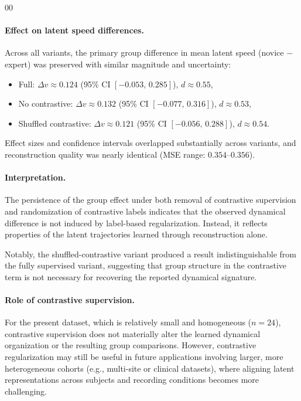 \documentclass[5p,twocolumn,authoryear]{elsarticle}
\begin{document}
\begin{thebibliography}{00}
\paragraph{Effect on latent speed differences.}
Across all variants, the primary group difference in mean latent speed (novice $-$ expert) was preserved with similar magnitude and uncertainty:
\begin{itemize}
    \item Full: $\Delta v \approx 0.124$ \; (95\% CI $[-0.053,\,0.285]$), $d \approx 0.55$,
    \item No contrastive: $\Delta v \approx 0.132$ \; (95\% CI $[-0.077,\,0.316]$), $d \approx 0.53$,
    \item Shuffled contrastive: $\Delta v \approx 0.121$ \; (95\% CI $[-0.056,\,0.288]$), $d \approx 0.54$.
\end{itemize}

Effect sizes and confidence intervals overlapped substantially across variants, and reconstruction quality was nearly identical (MSE range: $0.354$--$0.356$).

\paragraph{Interpretation.}
The persistence of the group effect under both removal of contrastive supervision and randomization of contrastive labels indicates that the observed dynamical difference is not induced by label-based regularization. Instead, it reflects properties of the latent trajectories learned through reconstruction alone.

Notably, the shuffled-contrastive variant produced a result indistinguishable from the fully supervised variant, suggesting that group structure in the contrastive term is not necessary for recovering the reported dynamical signature.

\paragraph{Role of contrastive supervision.}
For the present dataset, which is relatively small and homogeneous ($n=24$), contrastive supervision does not materially alter the learned dynamical organization or the resulting group comparisons. However, contrastive regularization may still be useful in future applications involving larger, more heterogeneous cohorts (e.g., multi-site or clinical datasets), where aligning latent representations across subjects and recording conditions becomes more challenging.


\end{thebibliography}
\end{document}
